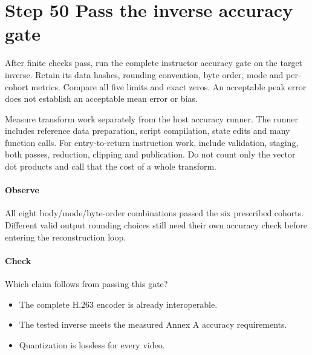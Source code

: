 \section{Step 50 Pass the inverse accuracy gate}\label{h263-transform-s10}
After finite checks pass, run the complete instructor accuracy gate on the target
inverse. Retain its data hashes, rounding convention, byte order, mode and per-cohort
metrics. Compare all five limits and exact zeros. An acceptable peak error does
not establish an acceptable mean error or bias.

Measure transform work separately from the host accuracy runner. The runner
includes reference data preparation, script compilation, state edits and many
function calls. For entry-to-return instruction work, include validation, staging,
both passes, reduction, clipping and publication. Do not count only the vector
dot products and call that the cost of a whole transform.

\paragraph{Observe} All eight body/mode/byte-order combinations passed the six
prescribed cohorts. Different valid output rounding choices still need their own
accuracy check before entering the reconstruction loop.
\paragraph{Check} Which claim follows from passing this gate?
\begin{itemize}
  \item[A.] The complete H.263 encoder is already interoperable.
  \item[B.] The tested inverse meets the measured Annex A accuracy requirements.
  \item[C.] Quantization is lossless for every video.
\end{itemize}
